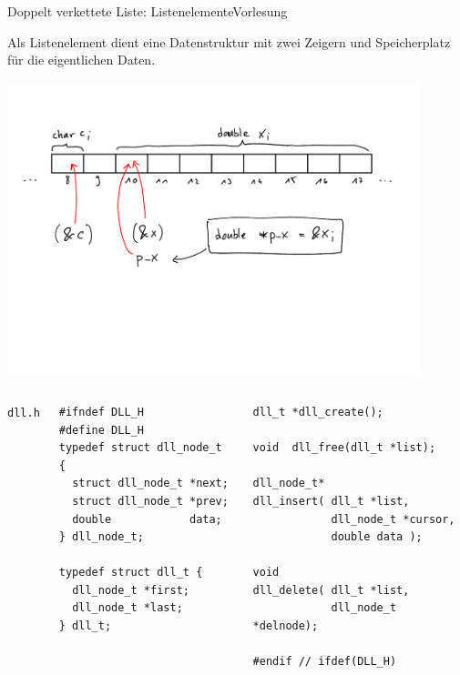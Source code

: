\documentclass[xcolor=dvipsnames]{beamer}
\newcounter{lecturecounter}
\begin{document}
\begin{frame}[fragile]{Doppelt verkettete Liste: Listenelemente}{Vorlesung }
\begin{block}{}
  Als Listenelement dient eine Datenstruktur mit zwei Zeigern und Speicherplatz für die eigentlichen Daten.
\end{block}
\includegraphics[width=0.9\textwidth,page=7,trim=0cm 16cm 0cm 2cm,clip=true]{graphics/c_kurs_tafel}
\begin{columns}
\texttt{dll.h}
\begin{lstlisting}
#ifndef DLL_H
#define DLL_H
typedef struct dll_node_t {
  struct dll_node_t *next;
  struct dll_node_t *prev;
  double            data;
} dll_node_t;

typedef struct dll_t {
  dll_node_t *first;
  dll_node_t *last;
} dll_t;
\end{lstlisting}
\begin{lstlisting}
dll_t *dll_create();

void  dll_free(dll_t *list);

dll_node_t* 
dll_insert( dll_t *list, 
            dll_node_t *cursor, 
            double data );

void 
dll_delete( dll_t *list, 
            dll_node_t *delnode);

#endif // ifdef(DLL_H)
\end{lstlisting}
\end{columns}
\end{frame}
\end{document}

